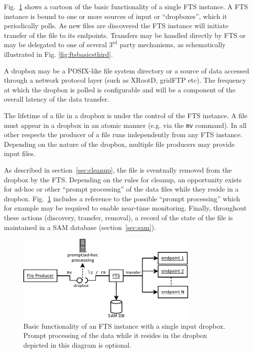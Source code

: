 \documentclass[pdftex,12pt,letter]{article}
\begin{document}
Fig.~\ref{fig:ftsbasics} shows a cartoon of the basic functionality
of a single FTS instance.  A FTS instance is bound to one or more
sources of input or ``dropboxes'', which it  periodically polls.
As new files are discovered the FTS instance will initiate transfer of the file to its endpoints.
Transfers may be handled directly by FTS or may be delegated to one of
several $3^\mathrm{rd}$ party mechanisms, as schematically illustrated
in  Fig. \ref{fig:ftsbasicsthird}.

A dropbox may be a POSIX-like file
system directory or a source of data accessed through a network protocol
layer (such as  XRootD, gridFTP etc). The frequency at which the dropbox is
polled is configurable and will be a component of the overall latency
of the data transfer.

The lifetime of a file in a dropbox is under the control of the FTS
instance.  A file must appear in a dropbox in an atomic manner
(e.g. via the \texttt{mv} command). In all other respects the producer
of a file runs independently from any FTS instance.  Depending on the
nature of the dropbox, multiple file producers may provide input files.



As described in
section~\ref{sec:cleanup}, the file is eventually removed from the
dropbox by the FTS.  Depending on the rules for cleanup, an opportunity
exists for ad-hoc or other ``prompt processing'' of the data files while
they reside in a dropbox. Fig.~\ref{fig:ftsbasics} includes a reference to the possible
``prompt processing'' which for example may be required to enable
near-time monitoring. Finally, throughout these actions (discovery, transfer,
removal), a record of the state of the file is maintained in a SAM
database (section~\ref{sec:sam}).

\begin{figure}[tbh]
  \centering
  \includegraphics[width=0.8\textwidth]{fts-basics.pdf}
  \caption{Basic functionality of an FTS instance with a single input dropbox.
Prompt processing of the data while it resides in the dropbox depicted in this diagram is optional.}
  \label{fig:ftsbasics}
\end{figure}
\end{document}
